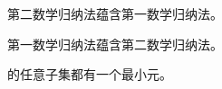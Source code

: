 \begin{frame}{}
  \begin{lemma}
    第二数学归纳法蕴含第一数学归纳法。
  \end{lemma}
\end{frame}

\begin{frame}{}
  \begin{lemma}
    第一数学归纳法蕴含第二数学归纳法。
  \end{lemma}
\end{frame}

\begin{frame}{}
  \begin{center}
  \end{center}
\end{frame}

\begin{frame}{}
  \begin{definition}
    的任意子集都有一个最小元。
  \end{definition}
\end{frame}

\begin{frame}{}
  \begin{theorem}{}
  \end{theorem}
\end{frame}
